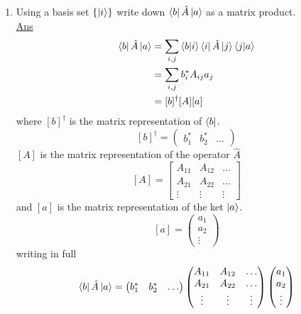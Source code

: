 \begin{enumerate}[label=\textbf{Example \arabic*},start=1]
	\item 
	Using a basis set $\{\ket{i} \}$ write down $\bra{b}\hat{A}\ket{a}$ as a matrix product.\\
	\underline{Ans}
	\begin{align}\label{eqn3.87-3.89}
		\bra{b}\hat{A}\ket{a} 
		&= \sum_{i, j} \braket{b}{i} \bra{i}\hat{A}\ket{j}\braket{j}{a}\\
		&=\sum_{i, j} b_i^* A_{i j} a_j \\
		&= [b]^\dagger [A] [a]
	\end{align}
	where $[b]^\dagger$ is the matrix representation of $\bra{b}$.
	\begin{equation}\label{eqn3.90}
	[b]^\dagger = \left(
	\begin{matrix}
	b_1^* & b_2^* & \ldots
	\end{matrix}
	\right)
	\end{equation}
	$[A]$ is the matrix representation of the operator $\hat{A}$
	\begin{equation}\label{eqn3.91}
	[A] = \left[
	\begin{matrix}
	A_{11} & A_{12} & \ldots \\
	A_{21} & A_{22} & \ldots \\
	\vdots & \vdots & \vdots
	\end{matrix}
	\right]
	\end{equation}
	and $[a]$ is the matrix representation of the ket $\ket{a}$.
	\begin{equation}\label{eqn3.92}
	[a] = \left(
	\begin{matrix}
	a_1 \\ a_2 \\ \vdots
	\end{matrix}
	\right)
	\end{equation}
	writing in full
	\begin{equation}\label{eqn3.93}
	\bra{b} \hat{A} \ket{a} = \left(
	\begin{matrix}
	b_1^* & b_2^* & \ldots
	\end{matrix}
	\right) \left(
	\begin{matrix}
	A_{11} & A_{12} & \ldots \\
	A_{21} & A_{22} & \ldots \\
	\vdots & \vdots & \vdots
	\end{matrix}
	\right)\left(
	\begin{matrix}
	a_1 \\ a_2 \\ \vdots
	\end{matrix}
	\right)
	\end{equation}
\end{enumerate}






